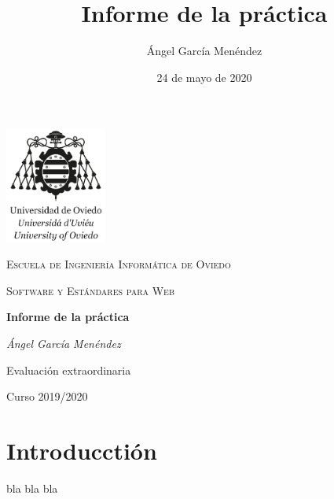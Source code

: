 \documentclass[11pt]{article}
\title{Informe de la práctica}
\author{Ángel García Menéndez}
\date{24 de mayo de 2020}
\begin{document}
        \begin{titlepage}
            \centering
            \includegraphics[width=0.25\textwidth]{logo}\par\vspace{1cm}
            {\scshape\LARGE Escuela de Ingeniería Informática de Oviedo\par}
            \vspace{1cm}
            {\scshape\Large Software y Estándares para Web\par}
            \vspace{1.5cm}
            {\huge\bfseries Informe de la práctica\par}
            \vspace{2cm}
            {\Large\itshape Ángel García Menéndez\par}
            \vfill
            Evaluación extraordinaria

            \vfill

            {\large Curso 2019/2020\par}
        \end{titlepage}

        \tableofcontents
        \newpage
        \section{Introducctión}\label{intro}
        bla bla bla

    
\end{document}

